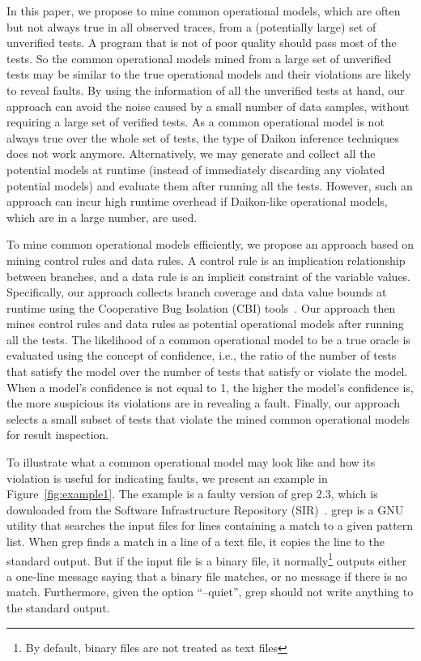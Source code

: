 \documentclass{sig-alternate}
\begin{document}
In this paper, we propose to mine common operational models, which
are often but not always true in all observed traces, from a
(potentially large) set of unverified tests. A program that is not
of poor quality should pass most of the tests. So the common
operational models mined from a large set of unverified tests may be
similar to the true operational models and their violations are
likely to reveal faults. By using the information of all the
unverified tests at hand, our approach can avoid the noise caused by
a small number of data samples, without requiring a large set of
verified tests. As a common operational model is not always true
over the whole set of tests, the type of Daikon inference techniques
does not work anymore. Alternatively, we may generate and collect
all the potential models at runtime (instead of immediately
discarding any violated potential models) and evaluate them after
running all the tests. However, such an approach can incur high
runtime overhead if Daikon-like operational models, which are in a
large number, are used.






To mine common operational models efficiently, we propose an
approach based on mining control rules and data rules. A control
rule is an implication relationship between branches, and a data
rule is an implicit constraint of the variable values. Specifically,
our approach collects branch coverage and data value bounds at
runtime using the Cooperative Bug Isolation (CBI)
tools~\cite{Liblit04}. Our approach then mines control rules and
data rules as potential operational models after running all the
tests. The likelihood of a common operational model to be a true
oracle is evaluated using the concept of confidence, i.e., the ratio
of the number of tests that satisfy the model over the number of
tests that satisfy or violate the model. When a model's confidence
is not equal to 1, the higher the model's confidence is, the more
suspicious its violations are in revealing a fault. Finally, our
approach selects a small subset of tests that violate the mined
common operational models for result inspection.


To illustrate what a common operational model may look like and how
its violation is useful for indicating faults, we present an example
in Figure~\ref{fig:example1}. The example is a faulty version of
grep 2.3, which is downloaded from the Software Infrastructure
Repository (SIR)~\cite{SIR}. grep is a GNU utility that searches the
input files for lines containing a match to a given pattern list.
When grep finds a match in a line of a text file, it copies the line
to the standard output. But if the input file is a binary file, it
normally\footnote{By default, binary files are not treated as text
files} outputs either a one-line message saying that a binary file
matches, or no message if there is no match. Furthermore, given the
option ``--quiet'', grep should not write anything to the standard
output.
\end{document}
